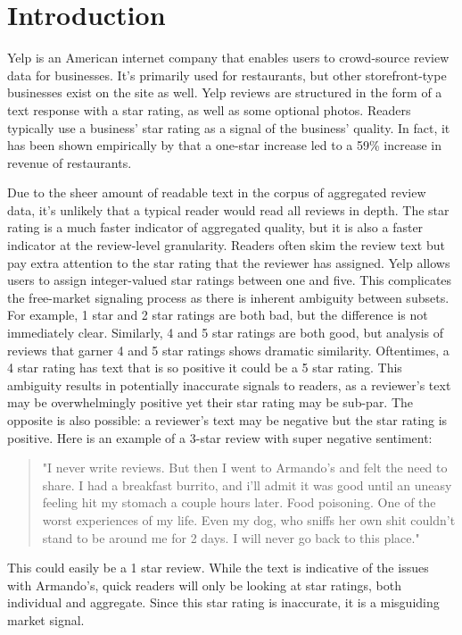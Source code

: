 \section{Introduction}
Yelp is an American internet company that enables users to crowd-source review data for businesses. It's primarily used for restaurants, but other storefront-type businesses exist on the site as well. Yelp reviews are structured in the form of a text response with a star rating, as well as some optional photos. Readers typically use a business' star rating as a signal of the business' quality. In fact, it has been shown empirically by \cite{luca_2011} that a one-star increase led to a 59\% increase in revenue of restaurants. 

\par
Due to the sheer amount of readable text in the corpus of aggregated review data, it's unlikely that a typical reader would read all reviews in depth. The star rating is a much faster indicator of aggregated quality, but it is also a faster indicator at the review-level granularity. Readers often skim the review text but pay extra attention to the star rating that the reviewer has assigned. Yelp allows users to assign integer-valued star ratings between one and five. This complicates the free-market signaling process as there is inherent ambiguity between subsets. For example, 1 star and 2 star ratings are both bad, but the difference is not immediately clear. Similarly, 4 and 5 star ratings are both good, but analysis of reviews that garner 4 and 5 star ratings shows dramatic similarity. Oftentimes, a 4 star rating has text that is so positive it could be a 5 star rating. This ambiguity results in potentially inaccurate signals to readers, as a reviewer's text may be overwhelmingly positive yet their star rating may be sub-par. The opposite is also possible: a reviewer's text may be negative but the star rating is positive. Here is an example of a 3-star review with super negative sentiment:
\begin{quote}
	"I never write reviews.  But then I went to Armando's and felt the need to share.   I had a breakfast burrito, and i'll admit it was good until an uneasy feeling hit my stomach a couple hours later.  Food poisoning.   One of the worst experiences of my life.   Even my dog, who sniffs her own shit couldn't stand to be around me for 2 days.   I will never go back to this place."
\end{quote}
This could easily be a 1 star review. While the text is indicative of the issues with Armando's, quick readers will only be looking at star ratings, both individual and aggregate. Since this star rating is inaccurate, it is a misguiding market signal.

